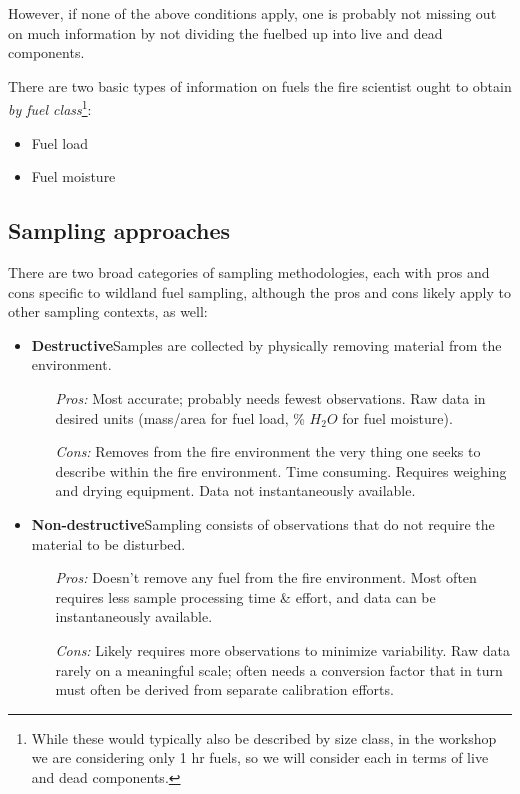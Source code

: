 However, if none of the above conditions apply, one is probably not missing out on much information by not dividing the fuelbed up into live and dead components.

There are two basic types of information on fuels the fire scientist ought to obtain \emph{by fuel class}\footnote{While these would typically also be described by size class, in the workshop we are considering only 1 hr fuels, so we will consider each in terms of live and dead components.}: 

\begin{itemize}
	\item Fuel load 
	\item Fuel moisture
\end{itemize}

\subsection{Sampling approaches}

There are two broad categories of sampling methodologies, each with pros and cons specific to wildland fuel sampling, although the pros and cons likely apply to other sampling contexts, as well: 
\begin{itemize}
	\item \textbf{Destructive\textemdash}Samples are collected by physically removing material from the environment. 
	\begin{itemize}
		\item[\textit{Pros:}]Most accurate; probably needs fewest observations. Raw data in desired units (mass/area for fuel load, \% $H_{2}O$ for fuel moisture).
		\item[\textit{Cons:}]Removes from the fire environment the very thing one seeks to describe within the fire environment. 
		Time consuming. 
		Requires weighing and drying equipment.
		Data not instantaneously available. 
	\end{itemize}
	\item \textbf{Non-destructive\textemdash}Sampling consists of observations that do not require the material to be disturbed. 
		\begin{itemize}
		\item[\textit{Pros:}]Doesn't remove any fuel from the fire environment. Most often requires less sample processing time \& effort, and data can be instantaneously available. 
		\item[\textit{Cons:}]Likely requires more observations to minimize variability. Raw data rarely on a meaningful scale; often needs a conversion factor that in turn must often be derived from separate calibration efforts.
	\end{itemize}
\end{itemize}

